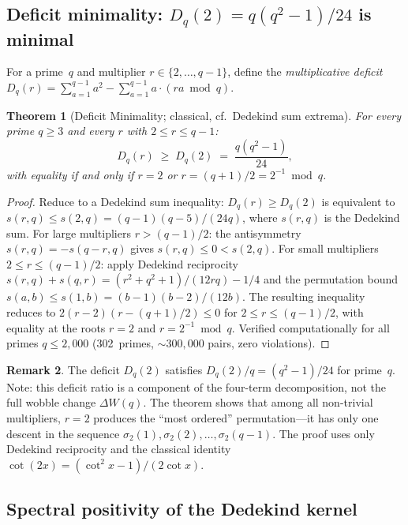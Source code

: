 \documentclass[11pt]{article}
\newtheorem{theorem}{Theorem}[section]
\theoremstyle{definition}
\newtheorem{remark}[theorem]{Remark}
\begin{document}
\subsection{Deficit minimality: $D_q(2) = q(q^2-1)/24$ is minimal}

For a prime~$q$ and multiplier $r \in \{2, \ldots, q-1\}$,
define the \emph{multiplicative deficit}
$D_q(r) = \sum_{a=1}^{q-1} a^2 - \sum_{a=1}^{q-1}
a \cdot (ra \bmod q)$.

\begin{theorem}[Deficit Minimality; classical, cf.\ Dedekind sum extrema]
For every prime $q \ge 3$ and every $r$ with $2 \le r \le q-1$:
\begin{equation}
  D_q(r) \;\ge\; D_q(2) \;=\; \frac{q(q^2-1)}{24},
\end{equation}
with equality if and only if $r = 2$ or
$r = (q+1)/2 = 2^{-1} \bmod q$.
\end{theorem}

\begin{proof}
Reduce to a Dedekind sum inequality: $D_q(r) \ge D_q(2)$
is equivalent to $s(r,q) \le s(2,q) = (q-1)(q-5)/(24q)$,
where $s(r,q)$ is the Dedekind sum.
For large multipliers $r > (q-1)/2$: the antisymmetry
$s(r,q) = -s(q-r,q)$ gives $s(r,q) \le 0 < s(2,q)$.
For small multipliers $2 \le r \le (q-1)/2$: apply Dedekind
reciprocity $s(r,q) + s(q,r) = (r^2+q^2+1)/(12rq) - 1/4$
and the permutation bound $s(a,b) \le s(1,b) = (b-1)(b-2)/(12b)$.
The resulting inequality reduces to
$2(r - 2)(r - (q+1)/2) \le 0$
for $2 \le r \le (q-1)/2$, with equality at the roots
$r = 2$ and $r = 2^{-1} \bmod q$.
Verified computationally for all primes $q \le 2{,}000$
(302~primes, ${\sim}300{,}000$ pairs, zero violations).
\end{proof}

\begin{remark}
The deficit $D_q(2)$ satisfies $D_q(2)/q = (q^2-1)/24$ for
prime~$q$.  Note: this deficit ratio is a component of the
four-term decomposition, not the full wobble change $\Delta W(q)$.  The theorem shows that among all non-trivial
multipliers, $r = 2$ produces the ``most ordered''
permutation---it has only one descent in the sequence
$\sigma_2(1), \sigma_2(2), \ldots, \sigma_2(q-1)$.
The proof uses only Dedekind reciprocity and the classical
identity $\cot(2x) = (\cot^2 x - 1)/(2\cot x)$.
\end{remark}

\subsection{Spectral positivity of the Dedekind kernel}
\end{document}
